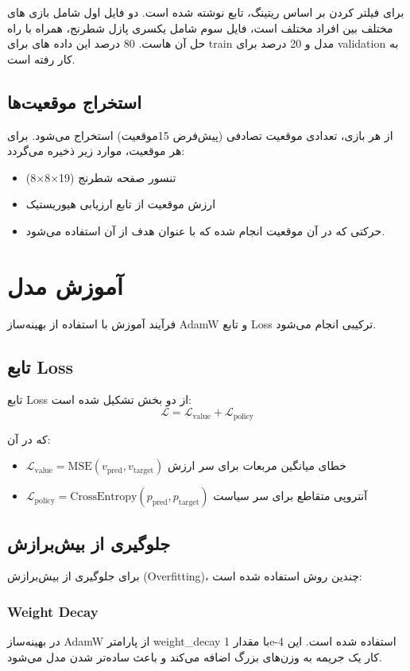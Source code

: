 \documentclass[12pt,a4paper]{article}
\begin{document}
	برای فیلتر کردن بر اساس ریتینگ، تابع  نوشته شده است. دو فایل اول شامل بازی های مختلف بین افراد مختلف است، فایل سوم شامل یکسری پازل شطرنج، همراه با راه حل آن هاست. 80 درصد این داده های برای train مدل و 20 درصد برای validation به کار رفته است.
	
	\subsection{استخراج موقعیت‌ها}
	از هر بازی، تعدادی موقعیت تصادفی (پیش‌فرض 15موقعیت) استخراج می‌شود. برای هر موقعیت، موارد زیر ذخیره می‌گردد:
	\begin{itemize}
		\item تنسور صفحه شطرنج (19×8×8)
		\item ارزش موقعیت از تابع ارزیابی هیوریستیک
		\item حرکتی که در آن موقعیت انجام شده که با عنوان هدف 
		از آن استفاده می‌شود.
	\end{itemize}
	
	\section{آموزش مدل}
	فرآیند آموزش با استفاده از بهینه‌ساز AdamW و تابع Loss ترکیبی انجام می‌شود.
	
	\subsection{تابع Loss}
	تابع Loss از دو بخش تشکیل شده است:
	\[
	\mathcal{L} = \mathcal{L}_{\text{value}} + \mathcal{L}_{\text{policy}}
	\]
	
	که در آن:
	\begin{itemize}
		\item \(\mathcal{L}_{\text{value}} = \text{MSE}(v_{\text{pred}}, v_{\text{target}})\) خطای میانگین مربعات برای سر ارزش
		\item \(\mathcal{L}_{\text{policy}} = \text{CrossEntropy}(p_{\text{pred}}, p_{\text{target}})\) آنتروپی متقاطع برای سر سیاست
	\end{itemize}
	
	\subsection{جلوگیری از بیش‌برازش}
	برای جلوگیری از بیش‌برازش (Overfitting)، چندین روش استفاده شده است:
	
	\subsubsection{Weight Decay}
	در بهینه‌ساز AdamW از پارامتر weight\_decay با مقدار 1e-4 استفاده شده است. این کار یک جریمه به وزن‌های بزرگ اضافه می‌کند و باعث ساده‌تر شدن مدل می‌شود.
	
\end{document}

